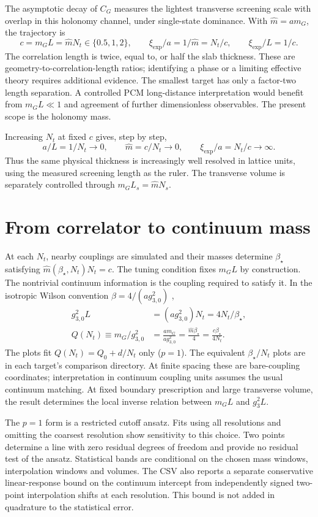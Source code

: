 \documentclass[11pt,a4paper]{article}
\begin{document}
The asymptotic decay of $C_G$ measures the lightest transverse screening
scale with overlap in this holonomy channel, under single-state dominance.
With $\widehat m=am_G$, the trajectory is
\[
 c=m_GL=\widehat m N_t\in\{0.5,1,2\},\qquad
 \xi_{\exp}/a=1/\widehat m=N_t/c,\qquad \xi_{\exp}/L=1/c.
\]
The correlation length is twice, equal to, or half the slab thickness.
These are geometry-to-correlation-length ratios; identifying a phase or a
limiting effective theory requires additional evidence. The smallest target
has only a factor-two length separation. A controlled PCM long-distance
interpretation would benefit from $m_GL\ll1$ and agreement of further
dimensionless observables. The present scope is the holonomy mass.

Increasing $N_t$ at fixed $c$ gives, step by step,
\[
 a/L=1/N_t\to0,\qquad \widehat m=c/N_t\to0,\qquad
 \xi_{\exp}/a=N_t/c\to\infty.
\]
Thus the same physical thickness is increasingly well resolved in lattice
units, using the measured screening length as the ruler. The transverse
volume is separately controlled through $m_GL_s=\widehat mN_s$.

\clearpage\section*{From correlator to continuum mass}
At each $N_t$, nearby couplings are simulated and their masses determine
$\beta_\star$ satisfying $\widehat m(\beta_\star,N_t)N_t=c$.
The tuning condition fixes $m_GL$ by construction. The nontrivial continuum
information is the coupling required to satisfy it. In the isotropic Wilson
convention $\beta=4/(ag_{3,0}^2)$ \cite{teper},
\begin{align*}
 g_{3,0}^2L&=(ag_{3,0}^2)N_t=4N_t/\beta_\star,\\
 Q(N_t)\equiv m_G/g_{3,0}^2
 &=\frac{am_G}{ag_{3,0}^2}
 =\frac{\widehat m\beta_\star}{4}
 =\frac{c\beta_\star}{4N_t}.
\end{align*}
The plots fit $Q(N_t)=Q_0+d/N_t$ only ($p=1$). The equivalent
$\beta_\star/N_t$ plots are in each target's comparison directory.
At finite spacing these are bare-coupling coordinates; interpretation in
continuum coupling units assumes the usual continuum matching. At fixed
boundary prescription and large transverse volume, the result determines
the local inverse relation between $m_GL$ and $g_3^2L$.

The $p=1$ form is a restricted cutoff ansatz. Fits using all resolutions
and omitting the coarsest resolution show sensitivity to this choice.
Two points determine a line with zero residual degrees of freedom and
provide no residual test of the ansatz. Statistical bands are conditional
on the chosen mass windows, interpolation windows and volumes. The CSV also
reports a separate conservative linear-response bound on the continuum
intercept from independently signed two-point interpolation shifts at each
resolution. This bound is not added in quadrature to the statistical error.
\end{document}
